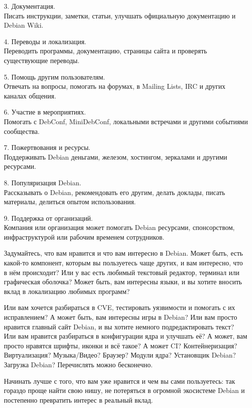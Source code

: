 3. Документация.\\
   Писать инструкции, заметки, статьи, улучшать официальную документацию и
   Debian Wiki.

4. Переводы и локализация.\\
   Переводить программы, документацию, страницы сайта и проверять существующие
   переводы.

5. Помощь другим пользователям.\\
   Отвечать на вопросы, помогать на форумах, в Mailing Lists, IRC и других
   каналах общения.

6. Участие в мероприятиях.\\
   Помогать с DebConf, MiniDebConf, локальными встречами и другими событиями
   сообщества.

7. Пожертвования и ресурсы.\\
   Поддерживать Debian деньгами, железом, хостингом, зеркалами и другими
   ресурсами.

8. Популяризация Debian.\\
   Рассказывать о Debian, рекомендовать его другим, делать доклады, писать
   материалы, делиться опытом использования.

9. Поддержка от организаций.\\
   Компания или организация может помогать Debian ресурсами, спонсорством,
   инфраструктурой или рабочим временем сотрудников.

Задумайтесь, что вам нравится и что вам интересно в Debian. Может быть, есть
какой-то компонент, которым вы пользуетесь чаще других, и вам интересно, что в
нём происходит? Или у вас есть любимый текстовый редактор, терминал или
графическая оболочка? Может быть, вам интересны языки, и вы хотите вносить вклад
в локализацию любимых программ?

\vspace{10cm}

Или вам хочется разбираться в CVE, тестировать уязвимости и помогать с их
исправлением? А может быть, вам интересны игры в Debian? Или вам просто нравится
главный сайт Debian, и вы хотите немного подредактировать текст? Или вам
нравится разбираться в конфигурации ядра и улучшать её? А может, вам просто
нравятся шрифты, иконки и всё такое? А может CI? Контейнеризация? Виртуализация?
Музыка/Видео? Браузер? Модули ядра?  Установщик Debian? Загрузка Debian?
Перечислять можно бесконечно.

Начинать лучше с того, что вам уже нравится и чем вы сами пользуетесь: так
гораздо проще найти свою нишу, не потеряться в огромной экосистеме Debian и
постепенно превратить интерес в реальный вклад.

